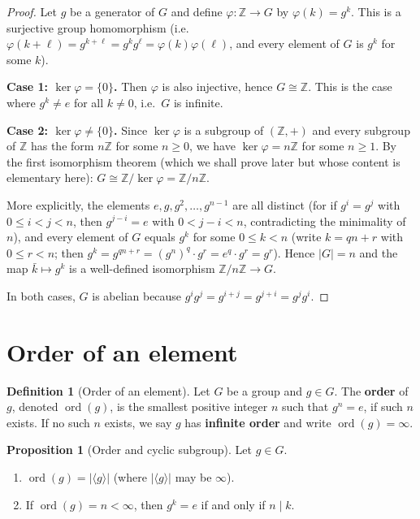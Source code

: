 \documentclass[12pt,a4paper,openany]{book}
\theoremstyle{definition}
\newtheorem{definition}{Definition}[chapter]
\newtheorem{proposition}{Proposition}[chapter]
\theoremstyle{remark}
\newcommand{\Z}{\mathbb{Z}}
\DeclareMathOperator{\ord}{ord}
\begin{document}
\begin{proof}
Let $g$ be a generator of $G$ and define $\varphi\colon\Z\to G$ by
$\varphi(k)=g^k$.  This is a surjective group homomorphism
(i.e.\ $\varphi(k+\ell)=g^{k+\ell}=g^kg^\ell=\varphi(k)\varphi(\ell)$,
and every element of $G$ is $g^k$ for some $k$).

\smallskip
\noindent\textbf{Case 1: $\ker\varphi=\{0\}$.}  Then $\varphi$ is also
injective, hence $G\cong\Z$.  This is the case where $g^k\neq e$ for all
$k\neq 0$, i.e.\ $G$ is infinite.

\smallskip
\noindent\textbf{Case 2: $\ker\varphi\neq\{0\}$.}  Since $\ker\varphi$ is
a subgroup of $(\Z,+)$ and every subgroup of $\Z$ has the form $n\Z$ for
some $n\ge 0$, we have $\ker\varphi = n\Z$ for some $n\ge 1$.  By the
first isomorphism theorem (which we shall prove later but whose content is
elementary here):
$G\cong\Z/\ker\varphi = \Z/n\Z$.

More explicitly, the elements $e,g,g^2,\ldots,g^{n-1}$ are all distinct
(for if $g^i=g^j$ with $0\le i<j<n$, then $g^{j-i}=e$ with $0<j-i<n$,
contradicting the minimality of $n$), and every element of $G$ equals
$g^k$ for some $0\le k<n$ (write $k=qn+r$ with $0\le r<n$; then
$g^k=g^{qn+r}=(g^n)^q\cdot g^r = e^q\cdot g^r = g^r$).  Hence
$|G|=n$ and the map $\bar k\mapsto g^k$ is a well-defined isomorphism
$\Z/n\Z\to G$.

In both cases, $G$ is abelian because $g^ig^j = g^{i+j} = g^{j+i} =
g^jg^i$.
\end{proof}

\section{Order of an element}
\label{sec:ch1-order}

\begin{definition}[Order of an element]
\label{def:order-element}
Let $G$ be a group and $g\in G$.  The \textbf{order} of $g$, denoted
$\ord(g)$\index{$\ord$}, is the smallest positive integer $n$ such that
$g^n=e$, if such $n$ exists.  If no such $n$ exists, we say $g$ has
\textbf{infinite order} and write $\ord(g)=\infty$.
\end{definition}

\begin{proposition}[Order and cyclic subgroup]
\label{prop:order-cyclic-subgroup}
Let $g\in G$.
\begin{enumerate}[label=(\roman*)]
  \item $\ord(g) = |\langle g\rangle|$ (where $|\langle g\rangle|$ may be
    $\infty$).
  \item If $\ord(g)=n<\infty$, then $g^k = e$ if and only if $n\mid k$.
\end{enumerate}
\end{proposition}
\end{document}
